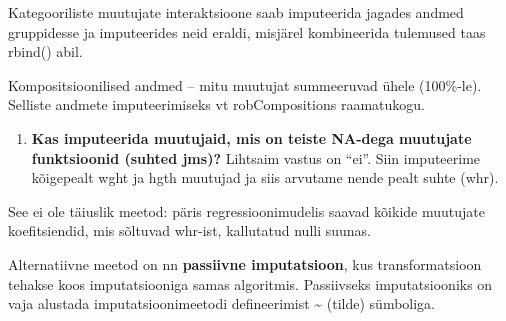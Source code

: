 \documentclass[]{book}
\newenvironment{Shaded}{\begin{snugshade}}{\end{snugshade}}
\newcommand{\KeywordTok}[1]{\textcolor[rgb]{0.13,0.29,0.53}{\textbf{#1}}}
\newcommand{\DataTypeTok}[1]{\textcolor[rgb]{0.13,0.29,0.53}{#1}}
\newcommand{\DecValTok}[1]{\textcolor[rgb]{0.00,0.00,0.81}{#1}}
\newcommand{\StringTok}[1]{\textcolor[rgb]{0.31,0.60,0.02}{#1}}
\newcommand{\OtherTok}[1]{\textcolor[rgb]{0.56,0.35,0.01}{#1}}
\newcommand{\OperatorTok}[1]{\textcolor[rgb]{0.81,0.36,0.00}{\textbf{#1}}}
\newcommand{\NormalTok}[1]{#1}
\providecommand{\tightlist}{%
  \setlength{\itemsep}{0pt}\setlength{\parskip}{0pt}}
\begin{document}
Kategooriliste muutujate interaktsioone saab imputeerida jagades andmed
gruppidesse ja imputeerides neid eraldi, misjärel kombineerida tulemused
taas rbind() abil.

Kompositsioonilised andmed -- mitu muutujat summeeruvad ühele
(100\%-le). Selliste andmete imputeerimiseks vt robCompositions
raamatukogu.

\begin{enumerate}
\def\labelenumi{\arabic{enumi}.}
\setcounter{enumi}{3}
\tightlist
\item
  \textbf{Kas imputeerida muutujaid, mis on teiste NA-dega muutujate
  funktsioonid (suhted jms)?} Lihtsaim vastus on ``ei''. Siin
  imputeerime kõigepealt wght ja hgth muutujad ja siis arvutame nende
  pealt suhte (whr).
\end{enumerate}

\begin{Shaded}
\end{Shaded}

See ei ole täiuslik meetod: päris regressioonimudelis saavad kõikide
muutujate koefitsiendid, mis sõltuvad whr-ist, kallutatud nulli suunas.

Alternatiivne meetod on nn \textbf{passiivne imputatsioon}, kus
transformatsioon tehakse koos imputatsiooniga samas algoritmis.
Passiivseks imputatsiooniks on vaja alustada imputatsioonimeetodi
defineerimist \textasciitilde{} (tilde) sümboliga.
\end{document}
